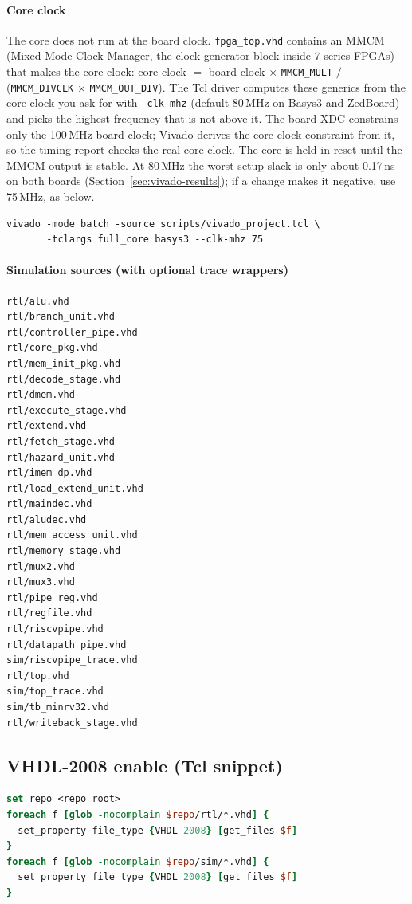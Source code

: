 \paragraph{Core clock}
The core does not run at the board clock. \texttt{fpga\_top.vhd} contains an
MMCM (Mixed-Mode Clock Manager, the clock generator block inside 7-series
FPGAs) that makes the core clock:
core clock $=$ board clock $\times$ \texttt{MMCM\_MULT} $/$
(\texttt{MMCM\_DIVCLK} $\times$ \texttt{MMCM\_OUT\_DIV}).
The Tcl driver computes these generics from the core clock you ask for with
\texttt{--clk-mhz} (default 80\,MHz on Basys3 and ZedBoard) and picks the highest
frequency that is not above it. The board XDC constrains only the 100\,MHz
board clock; Vivado derives the core clock constraint from it, so the timing
report checks the real core clock. The core is held in reset until the MMCM
output is stable. At 80\,MHz the worst setup slack is only about 0.17\,ns on
both boards (Section~\ref{sec:vivado-results}); if a change makes it negative,
use 75\,MHz, as below.
\begin{lstlisting}[style=minrv]
vivado -mode batch -source scripts/vivado_project.tcl \
       -tclargs full_core basys3 --clk-mhz 75
\end{lstlisting}

\paragraph{Simulation sources (with optional trace wrappers)}
\begin{lstlisting}[style=minrv]
rtl/alu.vhd
rtl/branch_unit.vhd
rtl/controller_pipe.vhd
rtl/core_pkg.vhd
rtl/mem_init_pkg.vhd
rtl/decode_stage.vhd
rtl/dmem.vhd
rtl/execute_stage.vhd
rtl/extend.vhd
rtl/fetch_stage.vhd
rtl/hazard_unit.vhd
rtl/imem_dp.vhd
rtl/load_extend_unit.vhd
rtl/maindec.vhd
rtl/aludec.vhd
rtl/mem_access_unit.vhd
rtl/memory_stage.vhd
rtl/mux2.vhd
rtl/mux3.vhd
rtl/pipe_reg.vhd
rtl/regfile.vhd
rtl/riscvpipe.vhd
rtl/datapath_pipe.vhd
sim/riscvpipe_trace.vhd
rtl/top.vhd
sim/top_trace.vhd
sim/tb_minrv32.vhd
rtl/writeback_stage.vhd
\end{lstlisting}

\subsection{VHDL-2008 enable (Tcl snippet)}
\label{sec:vivado-2008}
\begin{lstlisting}[style=minrv,language=tcl]
set repo <repo_root>
foreach f [glob -nocomplain $repo/rtl/*.vhd] {
  set_property file_type {VHDL 2008} [get_files $f]
}
foreach f [glob -nocomplain $repo/sim/*.vhd] {
  set_property file_type {VHDL 2008} [get_files $f]
}
\end{lstlisting}

